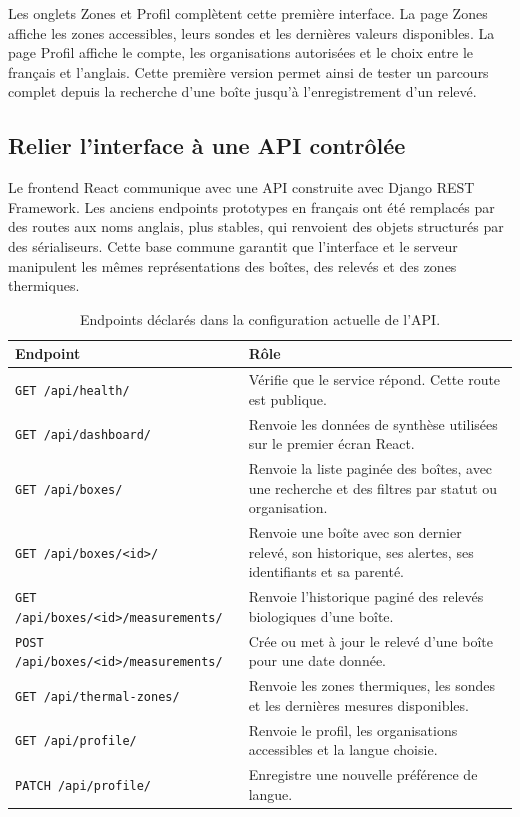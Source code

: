 \documentclass{article}
\begin{document}
Les onglets Zones et Profil complètent cette première interface. La page Zones affiche les zones accessibles, leurs sondes et les dernières valeurs disponibles. La page Profil affiche le compte, les organisations autorisées et le choix entre le français et l’anglais. Cette première version permet ainsi de tester un parcours complet depuis la recherche d’une boîte jusqu’à l’enregistrement d’un relevé.

\subsection{Relier l’interface à une API contrôlée}

Le frontend React communique avec une API construite avec Django REST Framework. Les anciens endpoints prototypes en français ont été remplacés par des routes aux noms anglais, plus stables, qui renvoient des objets structurés par des sérialiseurs. Cette base commune garantit que l’interface et le serveur manipulent les mêmes représentations des boîtes, des relevés et des zones thermiques.

\begin{table}[H]
\centering
\small
\begin{tabularx}{\textwidth}{p{}Y}
\toprule
\textbf{Endpoint} & \textbf{Rôle} \\
\midrule
\texttt{GET /api/health/} & Vérifie que le service répond. Cette route est publique. \\
\texttt{GET /api/dashboard/} & Renvoie les données de synthèse utilisées sur le premier écran React. \\
\texttt{GET /api/boxes/} & Renvoie la liste paginée des boîtes, avec une recherche et des filtres par statut ou organisation. \\
\texttt{GET /api/boxes/<id>/} & Renvoie une boîte avec son dernier relevé, son historique, ses alertes, ses identifiants et sa parenté. \\
\texttt{GET /api/boxes/<id>/measurements/} & Renvoie l’historique paginé des relevés biologiques d’une boîte. \\
\texttt{POST /api/boxes/<id>/measurements/} & Crée ou met à jour le relevé d’une boîte pour une date donnée. \\
\texttt{GET /api/thermal-zones/} & Renvoie les zones thermiques, les sondes et les dernières mesures disponibles. \\
\texttt{GET /api/profile/} & Renvoie le profil, les organisations accessibles et la langue choisie. \\
\texttt{PATCH /api/profile/} & Enregistre une nouvelle préférence de langue. \\
\bottomrule
\end{tabularx}
\caption{Endpoints déclarés dans la configuration actuelle de l’API.}
\label{tab:api-endpoints}
\end{table}
\end{document}
